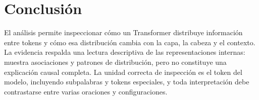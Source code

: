\documentclass[12pt,a4paper]{article}
\begin{document}
\section{Conclusión}
El análisis permite inspeccionar cómo un Transformer distribuye información entre tokens y cómo esa distribución cambia con la capa, la cabeza y el contexto. La evidencia respalda una lectura descriptiva de las representaciones internas: muestra asociaciones y patrones de distribución, pero no constituye una explicación causal completa. La unidad correcta de inspección es el token del modelo, incluyendo subpalabras y tokens especiales, y toda interpretación debe contrastarse entre varias oraciones y configuraciones.
\end{document}
